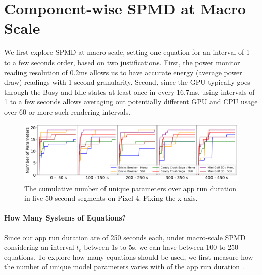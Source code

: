 \section{Component-wise SPMD at Macro Scale}
\label{sec:modelling_macro}


We first explore SPMD at macro-scale, \ie setting one equation for an interval of  1 to a few seconds order,
based on two justifications.
First, the power monitor reading resolution of 0.2ms allows us to
have accurate energy (average power draw) readings with 1 second granularity.
Second, since the GPU typically goes through the Busy and Idle states at least once
in every 16.7ms, using intervals of 1 to a few seconds 
allows averaging out potentially different GPU and CPU usage over 60 or more such rendering intervals.

\begin{figure}[tp]
    \centering
    \includegraphics[width=\textwidth]{figures/004_Pixel4_cummulative_parameters.png}
    \vspace{-0.1in}
    \caption{The cumulative number of unique parameters over app run duration in five 50-second segments on Pixel 4. Fixing the x axis.}
    \label{fig:number_parameters_vs_duration_100s}
    \vspace{-0.1in}
\end{figure}

\paragraph{How Many Systems of Equations?}
\label{subsec:relation}
Since our app run duration  are of 250 seconds each, under macro-scale SPMD  considering an interval $t_e$  between 1s to 5s, 
we can have between 100 to 250 equations.
To explore how many equations should be used,
we first measure how the number of unique model parameters varies with of the app run duration . 

